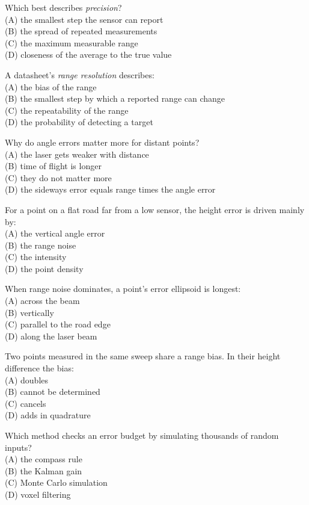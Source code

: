\item Which best describes \emph{precision}?\\[1pt] (A) the smallest step the sensor can report\\ (B) the spread of repeated measurements\\ (C) the maximum measurable range\\ (D) closeness of the average to the true value
\item A datasheet's \emph{range resolution} describes:\\[1pt] (A) the bias of the range\\ (B) the smallest step by which a reported range can change\\ (C) the repeatability of the range\\ (D) the probability of detecting a target
\item Why do angle errors matter more for distant points?\\[1pt] (A) the laser gets weaker with distance\\ (B) time of flight is longer\\ (C) they do not matter more\\ (D) the sideways error equals range times the angle error
\item For a point on a flat road far from a low sensor, the height error is driven mainly by:\\[1pt] (A) the vertical angle error\\ (B) the range noise\\ (C) the intensity\\ (D) the point density
\item When range noise dominates, a point's error ellipsoid is longest:\\[1pt] (A) across the beam\\ (B) vertically\\ (C) parallel to the road edge\\ (D) along the laser beam
\item Two points measured in the same sweep share a range bias. In their height difference the bias:\\[1pt] (A) doubles\\ (B) cannot be determined\\ (C) cancels\\ (D) adds in quadrature
\item Which method checks an error budget by simulating thousands of random inputs?\\[1pt] (A) the compass rule\\ (B) the Kalman gain\\ (C) Monte Carlo simulation\\ (D) voxel filtering
